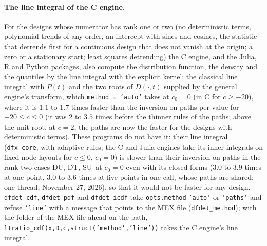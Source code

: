 \documentclass[11pt]{article}
\newcommand{\code}[1]{\texttt{#1}}
\newcommand{\Fu}{\textsf{DU}}
\newcommand{\Ft}{\textsf{DT}}
\newcommand{\Su}{\textsf{SU}}
\begin{document}
\paragraph{The line integral of the C engine.}  For the designs whose numerator has rank one or two (no deterministic terms, polynomial trends of any order, an intercept with sines and cosines, the statistic that detrends first for a continuous design that does not vanish at the origin; a zero or a stationary start; least squares detrending) the C engine, and the Julia, R and Python packages, also compute the distribution function, the density and the quantiles by the line integral with the explicit kernel: the classical line integral with $P(t)$ and the two roots of $D(\cdot,t)$ supplied by the general engine's transform, which \code{method = 'auto'} takes at $c_0=0$ (in C for $c\ge-20$), where it is $1.1$ to $1.7$ times faster than the inversion on paths per value for $-20\le c\le0$ (it was $2$ to $3.5$ times before the thinner rules of the paths; above the unit root, at $c=2$, the paths are now the faster for the designs with deterministic terms).  These programs do not have it: their line integral (\code{dfx\_core}, with adaptive rules; the C and Julia engines take its inner integrals on fixed node layouts for $c\le0$, $c_0=0$) is slower than their inversion on paths in the rank-two cases \Fu, \Ft, \Su\ at $c_0=0$ even with its closed forms ($3.0$ to $3.9$ times at one point, $3.0$ to $3.6$ times at five points in one call, whose paths are shared; one thread, November 27, 2026), so that it would not be faster for any design.  \code{dfdet\_cdf}, \code{dfdet\_pdf} and \code{dfdet\_icdf} take \code{opts.method} \code{'auto'} or \code{'paths'} and refuse \code{'line'} with a message that points to the MEX file (\code{dfdet\_method}); with the folder of the MEX file ahead on the path, \code{ltratio\_cdf(x,D,c,struct('method','line'))} takes the C engine's line integral.
\end{document}
